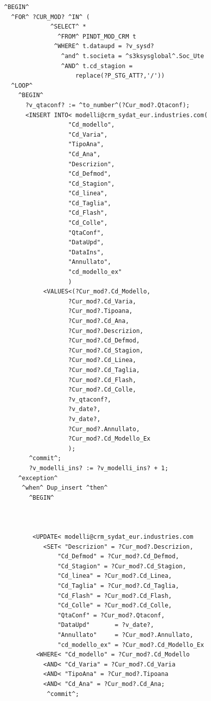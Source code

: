 \begin{lstlisting}[frame=single, style=base]
^BEGIN^
  ^FOR^ ?CUR_MOD? ^IN^ (
             ^SELECT^ * 
               ^FROM^ PINDT_MOD_CRM t 
              ^WHERE^ t.dataupd = ?v_sysd? 
                ^and^ t.societa = ^s3ksysglobal^.Soc_Ute
                ^AND^ t.cd_stagion = 
                    replace(?P_STG_ATT?,'/')) 
  ^LOOP^
    ^BEGIN^
      ?v_qtaconf? := ^to_number^(?Cur_mod?.Qtaconf);
      <INSERT INTO< modelli@crm_sydat_eur.industries.com(
                  "Cd_modello",
                  "Cd_Varia",
                  "TipoAna",
                  "Cd_Ana",
                  "Descrizion",
                  "Cd_Defmod",
                  "Cd_Stagion",
                  "Cd_linea",
                  "Cd_Taglia",
                  "Cd_Flash",
                  "Cd_Colle",
                  "QtaConf",
                  "DataUpd",
                  "DataIns",
                  "Annullato",
                  "cd_modello_ex"
                  )
           <VALUES<(?Cur_mod?.Cd_Modello,
                  ?Cur_mod?.Cd_Varia,
                  ?Cur_mod?.Tipoana,
                  ?Cur_mod?.Cd_Ana,
                  ?Cur_mod?.Descrizion,
                  ?Cur_mod?.Cd_Defmod,
                  ?Cur_mod?.Cd_Stagion,
                  ?Cur_mod?.Cd_Linea,
                  ?Cur_mod?.Cd_Taglia,
                  ?Cur_mod?.Cd_Flash,
                  ?Cur_mod?.Cd_Colle,
                  ?v_qtaconf?,
                  ?v_date?,
                  ?v_date?,
                  ?Cur_mod?.Annullato,
                  ?Cur_mod?.Cd_Modello_Ex                                                  
                  );
       ^commit^;
       ?v_modelli_ins? := ?v_modelli_ins? + 1;
    ^exception^
     ^when^ Dup_insert ^then^
       ^BEGIN^



        <UPDATE< modelli@crm_sydat_eur.industries.com 
           <SET< "Descrizion" = ?Cur_mod?.Descrizion,
               "Cd_Defmod" = ?Cur_mod?.Cd_Defmod,
               "Cd_Stagion" = ?Cur_mod?.Cd_Stagion,
               "Cd_linea" = ?Cur_mod?.Cd_Linea,
               "Cd_Taglia" = ?Cur_mod?.Cd_Taglia,
               "Cd_Flash" = ?Cur_mod?.Cd_Flash,
               "Cd_Colle" = ?Cur_mod?.Cd_Colle,
               "QtaConf" = ?Cur_mod?.Qtaconf,
               "DataUpd"       = ?v_date?,
               "Annullato"     = ?Cur_mod?.Annullato,
               "cd_modello_ex" = ?Cur_mod?.Cd_Modello_Ex
         <WHERE< "Cd_modello" = ?Cur_mod?.Cd_Modello
           <AND< "Cd_Varia" = ?Cur_mod?.Cd_Varia
           <AND< "TipoAna" = ?Cur_mod?.Tipoana
           <AND< "Cd_Ana" = ?Cur_mod?.Cd_Ana;
            ^commit^;
                                                  

\end{lstlisting}
